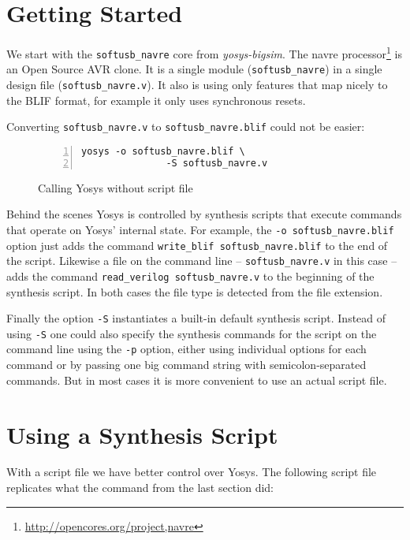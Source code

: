 \section{Getting Started}

We start with the {\tt softusb\_navre} core from {\it yosys-bigsim}. The navre
processor\footnote{\url{http://opencores.org/project,navre}} is an Open Source
AVR clone. It is a single module ({\tt softusb\_navre}) in a single design file
({\tt softusb\_navre.v}). It also is using only features that map nicely to
the BLIF format, for example it only uses synchronous resets.

Converting {\tt softusb\_navre.v} to {\tt softusb\_navre.blif} could not be
easier:

\begin{figure}[H]
\begin{lstlisting}[frame=trBL,xleftmargin=1.5em,numbers=left]
yosys -o softusb_navre.blif \
               -S softusb_navre.v
\end{lstlisting}
 \renewcommand{\figurename}{Listing}
\caption{Calling Yosys without script file}
\end{figure}

Behind the scenes Yosys is controlled by synthesis scripts that execute
commands that operate on Yosys' internal state. For example, the {\tt -o
softusb\_navre.blif} option just adds the command {\tt write\_blif
softusb\_navre.blif} to the end of the script. Likewise a file on the
command line -- {\tt softusb\_navre.v} in this case -- adds the command
{\tt read\_verilog softusb\_navre.v} to the beginning of the
synthesis script. In both cases the file type is detected from the
file extension.

Finally the option {\tt -S} instantiates a built-in default synthesis script.
Instead of using {\tt -S} one could also specify the synthesis commands
for the script on the command line using the {\tt -p} option, either using
individual options for each command or by passing one big command string
with semicolon-separated commands. But in most cases it is more convenient
to use an actual script file.

\section{Using a Synthesis Script}

With a script file we have better control over Yosys. The following script
file replicates what the command from the last section did:

